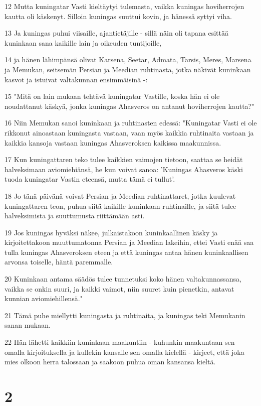 \par 12 Mutta kuningatar Vasti kieltäytyi tulemasta, vaikka kuningas hoviherrojen kautta oli käskenyt. Silloin kuningas suuttui kovin, ja hänessä syttyi viha.
\par 13 Ja kuningas puhui viisaille, ajantietäjille - sillä näin oli tapana esittää kuninkaan sana kaikille lain ja oikeuden tuntijoille,
\par 14 ja hänen lähimpänsä olivat Karsena, Seetar, Admata, Tarsis, Meres, Marsena ja Memukan, seitsemän Persian ja Meedian ruhtinasta, jotka näkivät kuninkaan kasvot ja istuivat valtakunnan ensimmäisinä -:
\par 15 "Mitä on lain mukaan tehtävä kuningatar Vastille, koska hän ei ole noudattanut käskyä, jonka kuningas Ahasveros on antanut hoviherrojen kautta?"
\par 16 Niin Memukan sanoi kuninkaan ja ruhtinasten edessä: "Kuningatar Vasti ei ole rikkonut ainoastaan kuningasta vastaan, vaan myös kaikkia ruhtinaita vastaan ja kaikkia kansoja vastaan kuningas Ahasveroksen kaikissa maakunnissa.
\par 17 Kun kuningattaren teko tulee kaikkien vaimojen tietoon, saattaa se heidät halveksimaan aviomiehiänsä, he kun voivat sanoa: 'Kuningas Ahasveros käski tuoda kuningatar Vastin eteensä, mutta tämä ei tullut'.
\par 18 Jo tänä päivänä voivat Persian ja Meedian ruhtinattaret, jotka kuulevat kuningattaren teon, puhua siitä kaikille kuninkaan ruhtinaille, ja siitä tulee halveksimista ja suuttumusta riittämään asti.
\par 19 Jos kuningas hyväksi näkee, julkaistakoon kuninkaallinen käsky ja kirjoitettakoon muuttumatonna Persian ja Meedian lakeihin, ettei Vasti enää saa tulla kuningas Ahasveroksen eteen ja että kuningas antaa hänen kuninkaallisen arvonsa toiselle, häntä paremmalle.
\par 20 Kuninkaan antama säädös tulee tunnetuksi koko hänen valtakunnassansa, vaikka se onkin suuri, ja kaikki vaimot, niin suuret kuin pienetkin, antavat kunnian aviomiehillensä."
\par 21 Tämä puhe miellytti kuningasta ja ruhtinaita, ja kuningas teki Memukanin sanan mukaan.
\par 22 Hän lähetti kaikkiin kuninkaan maakuntiin - kuhunkin maakuntaan sen omalla kirjoituksella ja kullekin kansalle sen omalla kielellä - kirjeet, että joka mies olkoon herra talossaan ja saakoon puhua oman kansansa kieltä.

\chapter{2}


